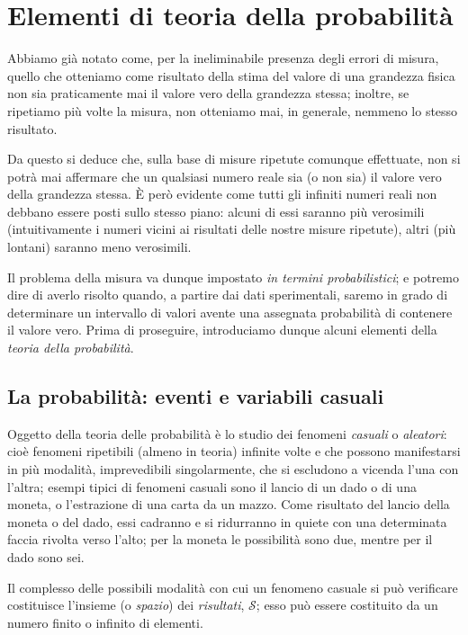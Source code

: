 
\chapter{Elementi di teoria della probabilit\`a}
Abbiamo gi\`a notato come, per la ineliminabile presenza
degli errori di misura, quello che otteniamo come risultato
della stima del valore di una grandezza fisica non sia
praticamente mai il valore vero della grandezza stessa;
inoltre, se ripetiamo pi\`u volte la misura, non otteniamo
mai, in generale, nemmeno lo stesso risultato.

Da questo si deduce che, sulla base di misure ripetute
comunque effettuate, non si potr\`a mai affermare che un
qualsiasi numero reale sia (o non sia) il valore vero della
grandezza stessa.  \`E per\`o evidente come tutti gli
infiniti numeri reali non debbano essere posti sullo stesso
piano: alcuni di essi saranno pi\`u verosimili
(intuitivamente i numeri vicini ai risultati delle nostre
misure ripetute), altri (pi\`u lontani) saranno meno
verosimili.

Il problema della misura va dunque impostato \emph{in
  termini probabilistici}; e potremo dire di averlo risolto
quando, a partire dai dati sperimentali, saremo in grado di
determinare un intervallo di valori avente una assegnata
probabilit\`a di contenere il valore vero.  Prima di
proseguire, introduciamo dunque alcuni elementi della
\emph{teoria della probabilit\`a}.

\section{La probabilit\`a: eventi e variabili casuali}%
\label{ch:3.varcas}
Oggetto della teoria delle probabilit\`a \`e lo studio dei
fenomeni \emph{casuali} o \emph{aleatori}: cio\`e fenomeni
ripetibili (almeno in teoria) infinite volte e che possono
manifestarsi in pi\`u modalit\`a, imprevedibili
singolarmente, che si escludono a vicenda l'una con l'altra;
esempi tipici di fenomeni casuali sono il lancio di un dado
o di una moneta, o l'estrazione di una carta da un mazzo.
Come risultato del lancio della moneta o del dado, essi
cadranno e si ridurranno in quiete con una determinata
faccia rivolta verso l'alto; per la moneta le possibilit\`a
sono due, mentre per il dado sono sei.

Il complesso delle possibili modalit\`a con cui un fenomeno
casuale si pu\`o verificare costituisce l'insieme (o
\emph{spazio}) dei \emph{risultati}, $\mathcal{S}$; esso
pu\`o essere costituito da un numero finito o infinito di
elementi.

